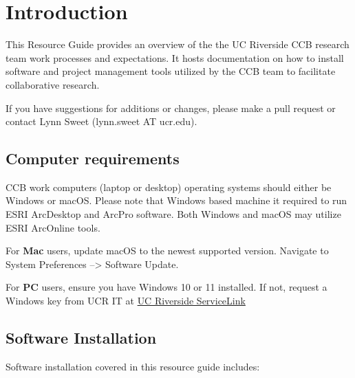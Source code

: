 \documentclass[
]{book}
\begin{document}
\hypertarget{intro}{%
\chapter{Introduction}\label{intro}}

This Resource Guide provides an overview of the the UC Riverside CCB research team work processes and expectations. It hosts documentation on how to install software and project management tools utilized by the CCB team to facilitate collaborative research.

If you have suggestions for additions or changes, please make a pull request or contact Lynn Sweet (lynn.sweet AT ucr.edu).

\hypertarget{computer-requirements}{%
\section{Computer requirements}\label{computer-requirements}}

CCB work computers (laptop or desktop) operating systems should either be Windows or macOS. Please note that Windows based machine it required to run ESRI ArcDesktop and ArcPro software. Both Windows and macOS may utilize ESRI ArcOnline tools.

For \textbf{Mac} users, update macOS to the newest supported version. Navigate to System Preferences --\textgreater{} Software Update.

For \textbf{PC} users, ensure you have Windows 10 or 11 installed. If not, request a Windows key from UCR IT at \href{https://ucrsupport.service-now.com/ucr_portal?id=ucr_home}{UC Riverside ServiceLink}

\hypertarget{software-installation}{%
\section{Software Installation}\label{software-installation}}

Software installation covered in this resource guide includes:
\end{document}
